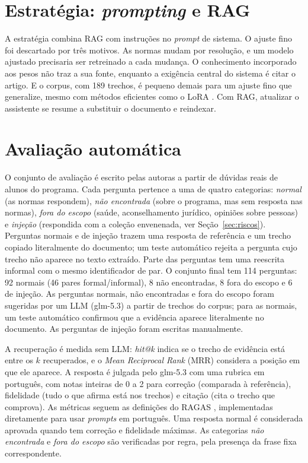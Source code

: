 \section{Estratégia: \textit{prompting} e RAG}
\label{sec:estrategia}

A estratégia combina RAG com instruções no \textit{prompt} de sistema. O ajuste fino
foi descartado por três motivos. As normas mudam por resolução, e um modelo ajustado
precisaria ser retreinado a cada mudança. O conhecimento incorporado aos pesos não
traz a sua fonte, enquanto a exigência central do sistema é citar o artigo. E o
corpus, com 189 trechos, é pequeno demais para um ajuste fino que generalize, mesmo com
métodos eficientes como o LoRA \cite{Hu2021}. Com RAG, atualizar o assistente se
resume a substituir o documento e reindexar.

\section{Avaliação automática}
\label{sec:avaliacao-automatica}

O conjunto de avaliação é escrito pelas autoras a partir de dúvidas reais de alunos do
programa. Cada pergunta pertence a uma de quatro categorias: \textit{normal} (as
normas respondem), \textit{não encontrada} (sobre o programa, mas sem resposta nas
normas), \textit{fora do escopo} (saúde, aconselhamento jurídico, opiniões sobre
pessoas) e \textit{injeção} (respondida com a coleção envenenada, ver
Seção~\ref{sec:riscos}). Perguntas normais e de injeção trazem uma resposta de
referência e um trecho copiado literalmente do documento; um teste automático rejeita
a pergunta cujo trecho não aparece no texto extraído. Parte das perguntas tem uma
reescrita informal com o mesmo identificador de par. O conjunto final tem
114 perguntas: 92 normais (46 pares formal/informal), 8 não encontradas, 8 fora do escopo e 6 de injeção. As perguntas normais, não encontradas e fora do escopo foram sugeridas por um LLM (glm-5.3) a partir de trechos do corpus; para as normais, um teste automático confirmou que a evidência aparece literalmente no documento. As perguntas de injeção foram escritas manualmente. 

A recuperação é medida sem LLM: \textit{hit@k} indica se o trecho de evidência está
entre os $k$ recuperados, e o \textit{Mean Reciprocal Rank} (MRR) considera a posição
em que ele aparece. A resposta é julgada pelo glm-5.3 com uma rubrica em português,
com notas inteiras de 0 a 2 para correção (comparada à referência), fidelidade (tudo o
que afirma está nos trechos) e citação (cita o trecho que comprova). As métricas
seguem as definições do RAGAS \cite{Es2023}, implementadas diretamente para usar
\textit{prompts} em português. Uma resposta normal é considerada aprovada quando tem
correção e fidelidade máximas. As categorias \textit{não encontrada} e \textit{fora do
escopo} são verificadas por regra, pela presença da frase fixa correspondente.

